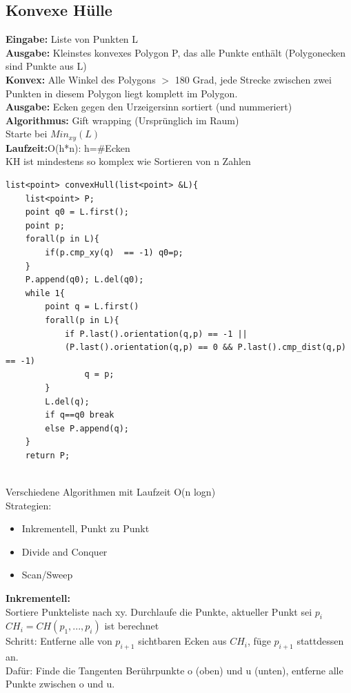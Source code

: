 \documentclass[a4paper]{article}
\begin{document}
\subsection*{Konvexe Hülle}
\textbf{Eingabe:} Liste von Punkten L\\
\textbf{Ausgabe:} Kleinstes konvexes Polygon P, das alle Punkte enthält (Polygonecken sind Punkte aus L)\\
\textbf{Konvex:} Alle Winkel des Polygons $>$ 180 Grad, jede Strecke zwischen zwei Punkten in diesem Polygon liegt komplett im Polygon.\\
\textbf{Ausgabe:} Ecken gegen den Urzeigersinn sortiert (und nummeriert)\\
\textbf{Algorithmus:} Gift wrapping (Ursprünglich im Raum)\\
\hspace*{1cm} Starte bei $Min_{xy}(L)$\\
\textbf{Laufzeit:}O(h*n): h=\#Ecken\\
\hspace*{1cm}KH ist mindestens so komplex wie Sortieren von n Zahlen\\
\begin{lstlisting}
list<point> convexHull(list<point> &L){
	list<point> P;
	point q0 = L.first();
	point p;
	forall(p in L){
		if(p.cmp_xy(q)  == -1) q0=p;
	}
	P.append(q0); L.del(q0);
	while 1{
		point q = L.first()
		forall(p in L){
			if P.last().orientation(q,p) == -1 ||
			(P.last().orientation(q,p) == 0 && P.last().cmp_dist(q,p) == -1)
				q = p;
		}
		L.del(q);
		if q==q0 break
		else P.append(q);
	}
	return P;
			
\end{lstlisting}
Verschiedene Algorithmen mit Laufzeit O(n logn)\\
Strategien:
\begin{itemize}
\item Inkrementell, Punkt zu Punkt
\item Divide and Conquer
\item Scan/Sweep
\end{itemize}
\textbf{Inkrementell:}\\
Sortiere Punkteliste nach xy. Durchlaufe die Punkte, aktueller Punkt sei $p_i$\\
$CH_i = CH(p_1,...,p_i)$ ist berechnet \\
Schritt: Entferne alle von $p_{i+1}$ sichtbaren Ecken aus $CH_i$, füge $p_{i+1}$ stattdessen an.\\
Dafür: Finde die Tangenten Berührpunkte o (oben) und u (unten), entferne alle Punkte zwischen o und u.\\
\end{document}
